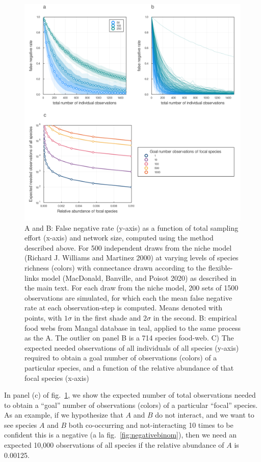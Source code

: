 \documentclass[10pt,oneside]{article}
\makeatletter
\def\maxwidth{\ifdim\Gin@nat@width>\linewidth\linewidth
\else\Gin@nat@width\fi}
\let\Oldincludegraphics\includegraphics
\renewcommand{\includegraphics}[1]{\Oldincludegraphics[width=\maxwidth]{#1}}
\makeatother
\begin{document}
\begin{figure}
\hypertarget{fig:totalobs}{%
\centering
\includegraphics{./figures/combinedfig2.png}
\caption{A and B: False negative rate (y-axis) as a function of total
sampling effort (x-axis) and network size, computed using the method
described above. For 500 independent draws from the niche model (Richard
J. Williams and Martinez 2000) at varying levels of species richness
(colors) with connectance drawn according to the flexible-links model
(MacDonald, Banville, and Poisot 2020) as described in the main text.
For each draw from the niche model, 200 sets of 1500 observations are
simulated, for which each the mean false negative rate at each
observation-step is computed. Means denoted with points, with
\(1\sigma\) in the first shade and \(2\sigma\) in the second. B:
empirical food webs from Mangal database in teal, applied to the same
process as the A. The outlier on panel B is a 714 species food-web. C)
The expected needed observations of all individuals of all species
(y-axis) required to obtain a goal number of observations (colors) of a
particular species, and a function of the relative abundance of that
focal species (x-axis)}\label{fig:totalobs}
}
\end{figure}

In panel (c) of fig.~\ref{fig:totalobs}, we show the expected number of
total observations needed to obtain a ``goal'' number of observations
(colors) of a particular ``focal'' species. As an example, if we
hypothesize that \(A\) and \(B\) do not interact, and we want to see
species \(A\) and \(B\) both co-occurring and not-interacting 10 times
to be confident this is a negative (a la fig.~\ref{fig:negativebinom}),
then we need an expected 10,000 observations of all species if the
relative abundance of \(A\) is 0.00125.
\end{document}
